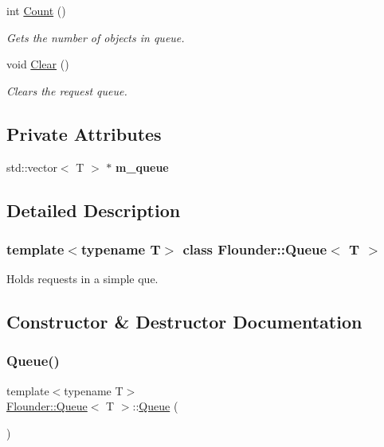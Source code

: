 \begin{DoxyCompactItemize}
int \hyperlink{class_flounder_1_1_queue_a6e69f20bb86b6f1b941225005901e3ea}{Count} ()
\begin{DoxyCompactList}\small\item\em Gets the number of objects in queue. \end{DoxyCompactList}\item 
void \hyperlink{class_flounder_1_1_queue_afbaa486e15b7f7b6c08dd568e75024a6}{Clear} ()
\begin{DoxyCompactList}\small\item\em Clears the request queue. \end{DoxyCompactList}\end{DoxyCompactItemize}
\subsection*{Private Attributes}
\begin{DoxyCompactItemize}
\item 
\mbox{\label{class_flounder_1_1_queue_af39616ab97d3f50612900b5ea565ca4c}} 
std\+::vector$<$ T $>$ $\ast$ {\bfseries m\+\_\+queue}
\end{DoxyCompactItemize}


\subsection{Detailed Description}
\subsubsection*{template$<$typename T$>$\newline
class Flounder\+::\+Queue$<$ T $>$}

Holds requests in a simple que. 



\subsection{Constructor \& Destructor Documentation}
\mbox{\label{class_flounder_1_1_queue_a4680872cb4584545750a058db5fdba01}} 
\subsubsection{\texorpdfstring{Queue()}{Queue()}}
{\footnotesize\ttfamily template$<$typename T$>$ \\
\hyperlink{class_flounder_1_1_queue}{Flounder\+::\+Queue}$<$ T $>$\+::\hyperlink{class_flounder_1_1_queue}{Queue} (\begin{DoxyParamCaption}{ }\end{DoxyParamCaption})\hspace{0.3cm}{\ttfamily [inline]}}



